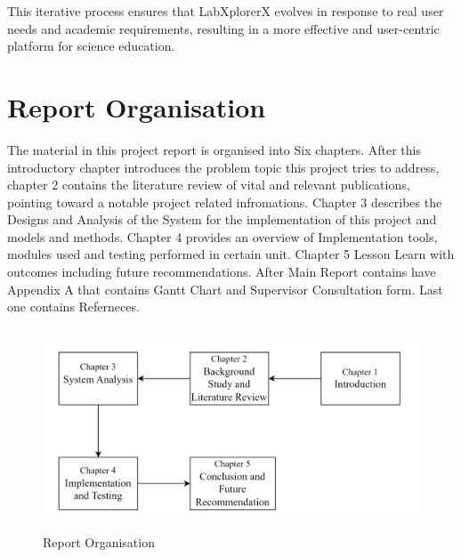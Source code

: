 This iterative process ensures that LabXplorerX evolves in response to real user needs and academic requirements, resulting in a more effective and user-centric platform for science education.
\section{Report Organisation}
The material in this project report is organised into Six chapters. After this introductory chapter introduces the problem topic this project tries to address, chapter 2 contains the literature review of vital and relevant publications, pointing toward a notable project related infromations. Chapter 3 describes the Designs and Analysis of the System for the implementation of this project and models and methods. Chapter 4 provides an overview of Implementation tools, modules used and testing performed in certain unit. Chapter 5 Lesson Learn with outcomes including future recommendations. After Main Report contains have Appendix A that contains Gantt Chart and Supervisor Consultation form. Last one contains Referneces.
\begin{figure}[H]
    \centering
     \includegraphics[height = 6cm]{Diagrams/organization.png}
     \caption{Report Organisation}
 \end{figure}